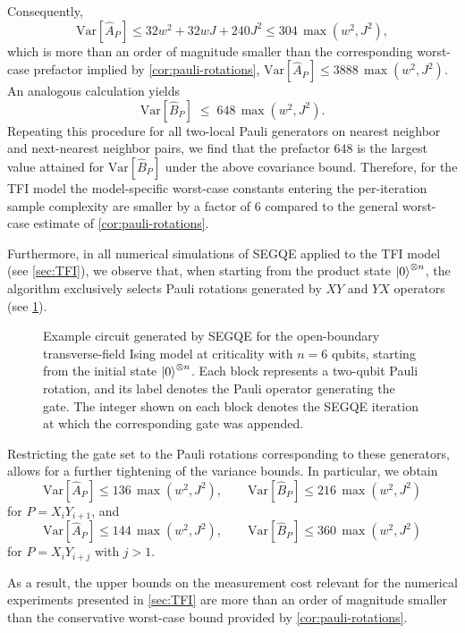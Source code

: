 Consequently,
\begin{equation}
    \mathrm{Var}[\hat A_P]
    \le 32w^2 + 32wJ + 240J^2
    \le 304\,\max(w^2,J^2),
\end{equation}
which is more than an order of magnitude smaller than the corresponding worst-case prefactor implied by \cref{cor:pauli-rotations},
$\mathrm{Var}[\hat A_P]\le 3888\,\max(w^2,J^2)$. An analogous calculation yields
\begin{equation}
    \mathrm{Var}[\hat B_P] \;\le\; 648\,\max(w^2,J^2).
\end{equation}
Repeating this procedure for all two-local Pauli generators on nearest neighbor and next-nearest neighbor pairs, we find that the prefactor $648$ is the largest value attained for $\mathrm{Var}[\hat B_P]$ under the above covariance bound. Therefore, for the TFI model the model-specific worst-case constants entering the per-iteration sample complexity are smaller by a factor of $6$ compared to the general worst-case estimate of \cref{cor:pauli-rotations}. 

Furthermore, in all numerical simulations of SEGQE applied to the TFI model (see \cref{sec:TFI}), we observe that, when starting from the product state $\ket{0}^{\otimes n}$, the algorithm exclusively selects Pauli rotations generated by $XY$ and $YX$ operators (see \cref{fig:example_circuit}). 
\begin{figure}
    \begin{center}
    \end{center}
    \caption{Example circuit generated by SEGQE for the open-boundary transverse-field Ising model at criticality with $n=6$ qubits, starting from the initial state $\ket{0}^{\otimes n}$. Each block represents a two-qubit Pauli rotation, and its label denotes the Pauli operator generating the gate. The integer shown on each block denotes the SEGQE iteration at which the corresponding gate was appended.}
    \label{fig:example_circuit}
\end{figure}
Restricting the gate set to the Pauli rotations corresponding to these generators, allows for a further tightening of the variance bounds. In particular, we obtain
\[
\mathrm{Var}[\hat A_P]\le 136\,\max(w^2,J^2), \qquad
\mathrm{Var}[\hat B_P]\le 216\,\max(w^2,J^2)
\]
for $P=X_iY_{i+1}$, and
\[
\mathrm{Var}[\hat A_P]\le 144\,\max(w^2,J^2), \qquad
\mathrm{Var}[\hat B_P]\le 360\,\max(w^2,J^2)
\]
for $P=X_iY_{i+j}$ with $j>1$.

As a result, the upper bounds on the measurement cost relevant for the numerical experiments presented in \cref{sec:TFI} are more than an order of magnitude smaller than the conservative worst-case bound provided by \cref{cor:pauli-rotations}.


